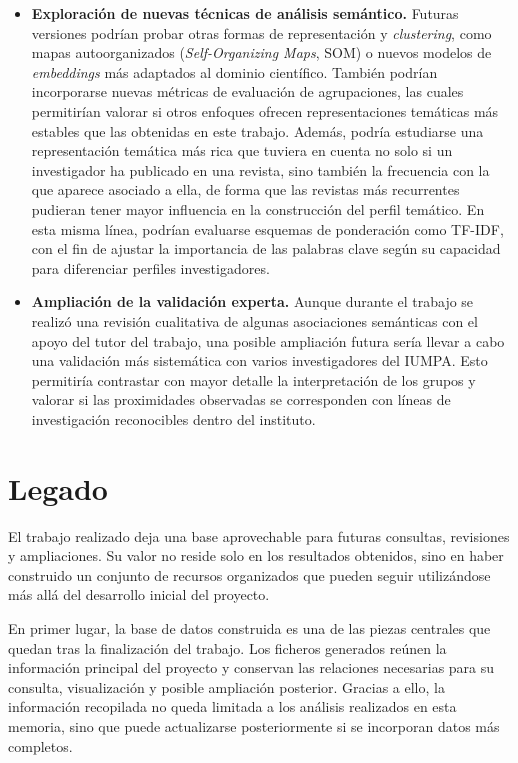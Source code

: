 \documentclass[11pt,spanish,listoffigures,listoftables]{tfgetsinf}
\begin{document}
\begin{itemize}
    \item \textbf{Exploración de nuevas técnicas de análisis semántico.} Futuras versiones podrían probar otras formas de representación y \textit{clustering}, como mapas autoorganizados (\textit{Self-Organizing Maps}, SOM) o nuevos modelos de \textit{embeddings} más adaptados al dominio científico. También podrían incorporarse nuevas métricas de evaluación de agrupaciones, las cuales permitirían valorar si otros enfoques ofrecen representaciones temáticas más estables que las obtenidas en este trabajo. Además, podría estudiarse una representación temática más rica que tuviera en cuenta no solo si un investigador ha publicado en una revista, sino también la frecuencia con la que aparece asociado a ella, de forma que las revistas más recurrentes pudieran tener mayor influencia en la construcción del perfil temático. En esta misma línea, podrían evaluarse esquemas de ponderación como TF-IDF, con el fin de ajustar la importancia de las palabras clave según su capacidad para diferenciar perfiles investigadores.

    \item \textbf{Ampliación de la validación experta.} Aunque durante el trabajo se realizó una revisión cualitativa de algunas asociaciones semánticas con el apoyo del tutor del trabajo, una posible ampliación futura sería llevar a cabo una validación más sistemática con varios investigadores del IUMPA. Esto permitiría contrastar con mayor detalle la interpretación de los grupos y valorar si las proximidades observadas se corresponden con líneas de investigación reconocibles dentro del instituto.
\end{itemize}

\section{Legado}

El trabajo realizado deja una base aprovechable para futuras consultas, revisiones y ampliaciones. Su valor no reside solo en los resultados obtenidos, sino en haber construido un conjunto de recursos organizados que pueden seguir utilizándose más allá del desarrollo inicial del proyecto.

En primer lugar, la base de datos construida es una de las piezas centrales que quedan tras la finalización del trabajo. Los ficheros generados reúnen la información principal del proyecto y conservan las relaciones necesarias para su consulta, visualización y posible ampliación posterior. Gracias a ello, la información recopilada no queda limitada a los análisis realizados en esta memoria, sino que puede actualizarse posteriormente si se incorporan datos más completos.
\end{document}
